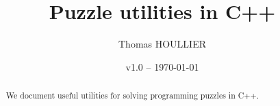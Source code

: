 \documentclass[letterpaper]{article}
\title{Puzzle utilities in C++}
\author{Thomas HOULLIER}
\begin{document}
\frenchspacing
\date{v1.0 -- \today}
\maketitle
\thispagestyle{FirstPage}

\begin{abstract}
We document useful utilities for solving programming puzzles in C++.
\end{abstract}


\begin{versionhistory}
\end{versionhistory}
\setcounter{table}{0} %

\tableofcontents
\printglossary[type=\acronymtype,style=index]
\pagestyle{plain}


\appendix
\cleardoublepage


\apptocmd{\thebibliography}{\raggedright}{}{}
\begingroup
{}
\setlength\bibitemsep{0pt}
\printbibliography
\endgroup
\end{document}
